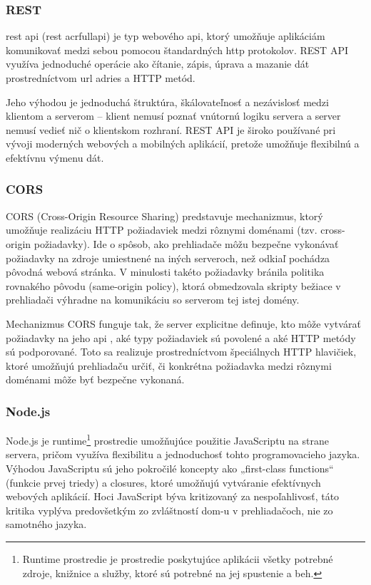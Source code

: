  \subsubsection{REST}
 \acrshort{rest} \acrshort{api} (\acrfull{rest} acrfull{api}) je typ webového \acrshort{api}, ktorý umožňuje aplikáciám komunikovať medzi sebou pomocou štandardných \acrshort{http} protokolov. 
 REST API využíva jednoduché operácie ako čítanie, zápis, úprava a mazanie dát prostredníctvom \acrshort{url} adries a HTTP metód.

Jeho výhodou je jednoduchá štruktúra, škálovateľnosť a nezávislosť medzi klientom a serverom – klient nemusí poznať vnútornú logiku servera a server nemusí vedieť nič o klientskom rozhraní.
 REST API je široko používané pri vývoji moderných webových a mobilných aplikácií, pretože umožňuje flexibilnú a efektívnu výmenu dát.
\subsubsection{CORS}
CORS (Cross-Origin Resource Sharing) predstavuje mechanizmus, ktorý umožňuje realizáciu HTTP požiadaviek medzi rôznymi doménami (tzv. cross-origin požiadavky).
 Ide o spôsob, ako prehliadače môžu bezpečne vykonávať požiadavky na zdroje umiestnené na iných serveroch, než odkiaľ pochádza pôvodná webová stránka. 
 V minulosti takéto požiadavky bránila politika rovnakého pôvodu (same-origin policy), ktorá obmedzovala skripty bežiace v prehliadači výhradne na komunikáciu so serverom tej istej domény.

Mechanizmus CORS funguje tak, že server explicitne definuje, kto môže vytvárať požiadavky na jeho \acrshort{api}
, aké typy požiadaviek sú povolené a aké HTTP metódy sú podporované.
 Toto sa realizuje prostredníctvom špeciálnych HTTP hlavičiek, ktoré umožňujú prehliadaču určiť, či konkrétna požiadavka medzi rôznymi doménami môže byť bezpečne vykonaná.
 \cite{CORS}
\subsubsection{Node.js}
Node.js je runtime\footnote{Runtime prostredie je prostredie poskytujúce aplikácii všetky potrebné zdroje, knižnice a služby, ktoré sú potrebné na jej spustenie a beh.}
prostredie umožňujúce použitie JavaScriptu na strane servera, pričom využíva flexibilitu a jednoduchosť tohto programovacieho jazyka.
 Výhodou JavaScriptu sú jeho pokročilé koncepty ako „first-class functions“ (funkcie prvej triedy) a closures, ktoré umožňujú vytváranie efektívnych webových aplikácií. 
 Hoci JavaScript býva kritizovaný za nespoľahlivosť, táto kritika vyplýva predovšetkým zo zvláštností \acrshort{dom}-u v prehliadačoch, nie zo samotného jazyka.
